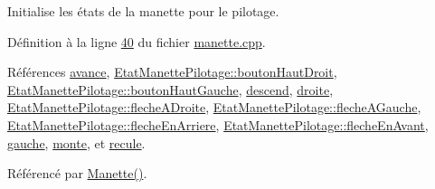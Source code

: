 Initialise les états de la manette pour le pilotage. 



Définition à la ligne \hyperlink{manette_8cpp_source_l00040}{40} du fichier \hyperlink{manette_8cpp_source}{manette.\+cpp}.



Références \hyperlink{manette_8h_source_l00247}{avance}, \hyperlink{manette_8h_source_l00157}{Etat\+Manette\+Pilotage\+::bouton\+Haut\+Droit}, \hyperlink{manette_8h_source_l00156}{Etat\+Manette\+Pilotage\+::bouton\+Haut\+Gauche}, \hyperlink{manette_8h_source_l00252}{descend}, \hyperlink{manette_8h_source_l00250}{droite}, \hyperlink{manette_8h_source_l00155}{Etat\+Manette\+Pilotage\+::fleche\+A\+Droite}, \hyperlink{manette_8h_source_l00154}{Etat\+Manette\+Pilotage\+::fleche\+A\+Gauche}, \hyperlink{manette_8h_source_l00153}{Etat\+Manette\+Pilotage\+::fleche\+En\+Arriere}, \hyperlink{manette_8h_source_l00152}{Etat\+Manette\+Pilotage\+::fleche\+En\+Avant}, \hyperlink{manette_8h_source_l00249}{gauche}, \hyperlink{manette_8h_source_l00251}{monte}, et \hyperlink{manette_8h_source_l00248}{recule}.



Référencé par \hyperlink{manette_8cpp_source_l00009}{Manette()}.



